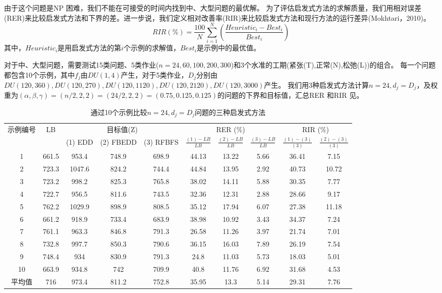 由于这个问题是NP 困难，我们不能在可接受的时间内找到中、大型问题的最优解。
为了评估启发式方法的求解质量，我们用相对误差(RER)来比较启发式方法和下界的差。进一步说，我们定义相对改善率(RIR)来比较启发式方法和现行方法的运行差异(Mokhtari，2010)。
\[RIR(\%) = \frac{100}{N}\sum_{i=1}^N \left(\frac{Heuristic_i - Best_i}{Best_i}\right)
\]
其中，$Heuristic_i$是用启发式方法的第$i$个示例的求解值，$Best_i$是示例中的最优值。

对于中、大型问题，需要测试15类问题、5类作业($n = 24,60,100,200,300$)和3个水准的工期(紧张(T),正常(N),松弛(L))的组合。
每一个问题都包含10个示例，其中$f_j$由$DU(1,4)$产生，对于5类作业，$D_j$分别由$DU(120,360),DU(120,270),DU(120,1120),DU(120,2120),DU(120,3000)$产生。
我们用3种启发式方法计算$n=24,d_j=D_j$，及权重为$(\alpha,\beta,\gamma)=(n/2,2,2)=(24/2,2,2)=(0.75,0.125,0.125)$的问题的下界和目标值，汇总RER 和RIR 见。
\begin{table}[h]
  \centering\xiaowu
  \caption{通过10个示例比较$n=24, d_j = D_j$问题的三种启发式方法\label{tab:comparen=24}}
    \begin{tabular}{cccccccccc}
    \toprule
    \multirow{2}[4]{*}{示例编号} & \multirow{2}[4]{*}{LB}   & \multicolumn{3}{c}{目标值(Z)} & \multicolumn{3}{c}{RER (\%)} & \multicolumn{2}{c}{RIR (\%)} \\
    \cmidrule(lr){3-5}\cmidrule(lr){6-8}\cmidrule(lr){9-10}
          &       & (1) EDD & (2) FBEDD & (3) RFBFS &\parbox[c][8mm]{0pt}{} $\frac{(1) - LB}{LB}$ & $\frac{(2) - LB}{LB}$ & $\frac{(3) - LB}{LB}$ &$\frac{(1) - (3)}{(3)}$ & $\frac{(2) - (3)}{(3)}$ \\
               & 661.5 & 953.4 & 748.9 & 698.9 & 44.13 & 13.22 & 5.66  & 36.41 & 7.15 \\
    2     & 723.3 & 1047.6 & 824.2 & 744.4 & 44.84 & 13.95 & 2.92  & 40.73 & 10.72 \\
    3     & 723.2 & 998.2 & 825.3 & 765.8 & 38.02 & 14.11 & 5.88  & 30.35 & 7.77 \\
    4     & 722.7 & 956.5 & 811.6 & 743.5 & 32.36 & 12.31 & 2.88  & 28.66 & 9.17 \\
    5     & 762.2 & 1029.9 & 898.9 & 808.5 & 35.12 & 17.94 & 6.07  & 27.38 & 11.18 \\
    6     & 661.2 & 918.9 & 733.4 & 683.9 & 38.98 & 10.92 & 3.43  & 34.37 & 7.24 \\
    7     & 761.1 & 963.3 & 846.8 & 791.3 & 26.58 & 11.26 & 3.97  & 21.74 & 7.01 \\
    8     & 732.8 & 997.7 & 850.3 & 790.6 & 36.15 & 16.03 & 7.89  & 26.19 & 7.54 \\
    9     & 748.4 & 934   & 830.9 & 791.3 & 24.8  & 11.03 & 5.73  & 18.03 & 5.01 \\
    10    & 663.9 & 934.8 & 742   & 709.9 & 40.8  & 11.76 & 6.92  & 31.68 & 4.53 \\[3pt]
    平均值   & 716   & 973.4 & 811.2 & 752.8 & 35.95 & 13.3  & 5.14  & 29.31 & 7.76 \\
    \bottomrule
    \end{tabular}
\end{table}
